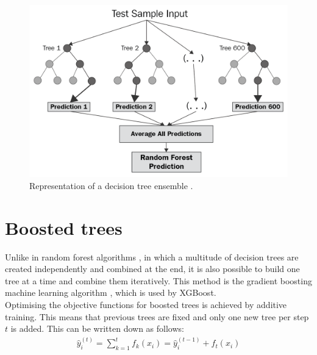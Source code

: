 \begin{figure}
  \centering
  \includegraphics[height=0.6\textwidth]{images/random_forest.png}
  \caption{Representation of a decision tree ensemble \cite{random_forest}.}
  \label{fig:random_forest}
\end{figure}

\section{Boosted trees}
Unlike in random forest algorithms \cite{random}, in which a multitude of decision trees are created independently and combined at the end,
it is also possible to build one tree at a time and
combine them iteratively. This method is the gradient boosting machine learning algorithm \cite{gradient}, which is used by XGBoost. \\
Optimising the objective functions for
boosted trees is achieved by additive training. This means that previous trees are fixed and only one new tree per step $t$ is added. This can be written
down as follows:
\begin{align}
  \hat{y}_i^{(t)} = \sum_{k=1}^t f_k(x_i) = \hat{y}_i^{(t-1)} + f_t(x_i)
\end{align}


